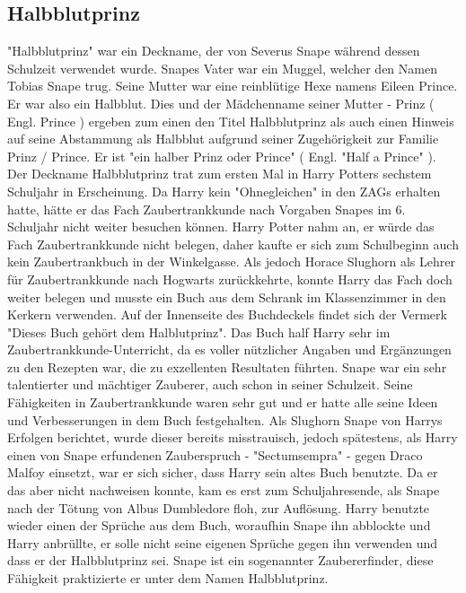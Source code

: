 \documentclass[a4paper, 10pt]{article}
\begin{document}
\subsection*{\Large Halbblutprinz}
"Halbblutprinz" war ein Deckname, der von Severus Snape während dessen Schulzeit verwendet wurde.
\vspace{10pt}
\newline
Snapes Vater war ein Muggel, welcher den Namen Tobias Snape trug. Seine Mutter war eine reinblütige Hexe namens Eileen Prince. Er war also ein Halbblut. Dies und der Mädchenname seiner Mutter - Prinz (  Engl.  Prince ) ergeben zum einen den Titel Halbblutprinz als auch einen Hinweis auf seine Abstammung als Halbblut aufgrund seiner Zugehörigkeit zur Familie Prinz / Prince. Er ist "ein halber Prinz oder Prince" (  Engl.  "Half a Prince" ).
\vspace{10pt}
\newline
Der Deckname Halbblutprinz trat zum ersten Mal in Harry Potters sechstem Schuljahr in Erscheinung. Da Harry kein "Ohnegleichen" in den ZAGs erhalten hatte, hätte er das Fach Zaubertrankkunde nach Vorgaben Snapes im 6. Schuljahr nicht weiter besuchen können. Harry Potter nahm an, er würde das Fach Zaubertrankkunde nicht belegen, daher kaufte er sich zum Schulbeginn auch kein Zaubertrankbuch in der Winkelgasse. Als jedoch Horace Slughorn als Lehrer für Zaubertrankkunde nach Hogwarts zurückkehrte, konnte Harry das Fach doch weiter belegen und musste ein Buch aus dem Schrank im Klassenzimmer in den Kerkern verwenden. Auf der Innenseite des Buchdeckels findet sich der Vermerk "Dieses Buch gehört dem Halblutprinz". Das Buch half Harry sehr im Zaubertrankkunde-Unterricht, da es voller nützlicher Angaben und Ergänzungen zu den Rezepten war, die zu exzellenten Resultaten führten. Snape war ein sehr talentierter und mächtiger Zauberer, auch schon in seiner Schulzeit. Seine Fähigkeiten in Zaubertrankkunde waren sehr gut und er hatte alle seine Ideen und Verbesserungen in dem Buch festgehalten.
\vspace{10pt}
\newline
Als Slughorn Snape von Harrys Erfolgen berichtet, wurde dieser bereits misstrauisch, jedoch spätestens, als Harry einen von Snape erfundenen Zauberspruch - "Sectumsempra" - gegen Draco Malfoy einsetzt, war er sich sicher, dass Harry sein altes Buch benutzte. Da er das aber nicht nachweisen konnte, kam es erst zum Schuljahresende, als Snape nach der Tötung von Albus Dumbledore floh, zur Auflösung. Harry benutzte wieder einen der Sprüche aus dem Buch, woraufhin Snape ihn abblockte und Harry anbrüllte, er solle nicht seine eigenen Sprüche gegen ihn verwenden und dass er der Halbblutprinz sei.
\vspace{10pt}
\newline
Snape ist ein sogenannter Zaubererfinder, diese Fähigkeit praktizierte er unter dem Namen Halbblutprinz.
\end{document}

